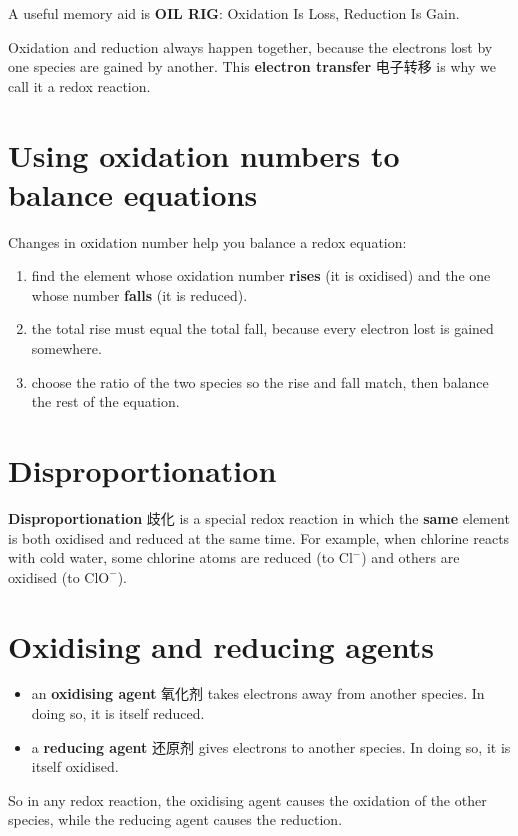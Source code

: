 \documentclass[11pt]{article}
\begin{document}
A useful memory aid is \textbf{OIL RIG}: Oxidation Is Loss, Reduction Is Gain.

Oxidation and reduction always happen together, because the electrons lost by one species are gained by another. This \textbf{electron transfer} 电子转移 is why we call it a redox reaction.

\section*{Using oxidation numbers to balance equations}

Changes in oxidation number help you balance a redox equation:

\begin{enumerate}
\item find the element whose oxidation number \textbf{rises} (it is oxidised) and the one whose number \textbf{falls} (it is reduced).

\item the total rise must equal the total fall, because every electron lost is gained somewhere.

\item choose the ratio of the two species so the rise and fall match, then balance the rest of the equation.

\end{enumerate}

\section*{Disproportionation}

\textbf{Disproportionation} 歧化 is a special redox reaction in which the \textbf{same} element is both oxidised and reduced at the same time. For example, when chlorine reacts with cold water, some chlorine atoms are reduced (to $\text{Cl}^-$) and others are oxidised (to $\text{ClO}^-$).

\section*{Oxidising and reducing agents}

\begin{itemize}
\item an \textbf{oxidising agent} 氧化剂 takes electrons away from another species. In doing so, it is itself reduced.

\item a \textbf{reducing agent} 还原剂 gives electrons to another species. In doing so, it is itself oxidised.

\end{itemize}

So in any redox reaction, the oxidising agent causes the oxidation of the other species, while the reducing agent causes the reduction.
\end{document}
